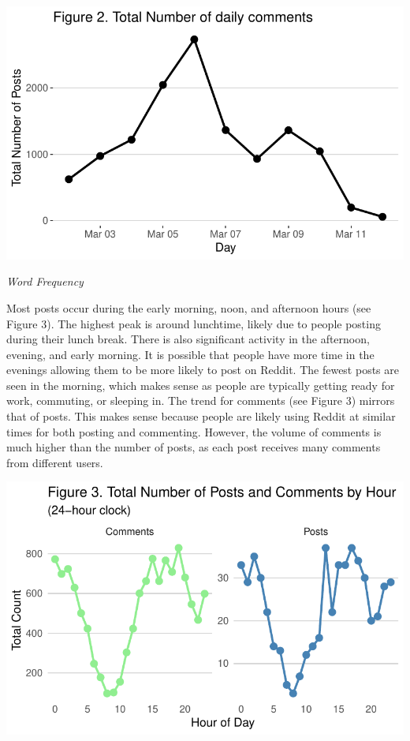 \documentclass[
  12pt]{article}
\begin{document}
\includegraphics{paper_files/figure-pdf/unnamed-chunk-4-1.pdf}

\emph{Word Frequency}

Most posts occur during the early morning, noon, and afternoon hours
(see Figure 3). The highest peak is around lunchtime, likely due to
people posting during their lunch break. There is also significant
activity in the afternoon, evening, and early morning. It is possible
that people have more time in the evenings allowing them to be more
likely to post on Reddit. The fewest posts are seen in the morning,
which makes sense as people are typically getting ready for work,
commuting, or sleeping in. The trend for comments (see Figure 3) mirrors
that of posts. This makes sense because people are likely using Reddit
at similar times for both posting and commenting. However, the volume of
comments is much higher than the number of posts, as each post receives
many comments from different users.

\includegraphics{paper_files/figure-pdf/unnamed-chunk-5-1.pdf}
\end{document}
